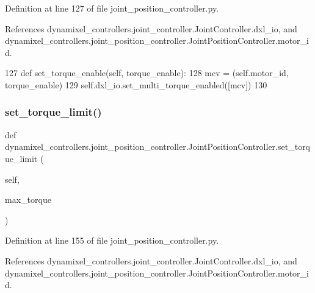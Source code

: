 Definition at line 127 of file joint\+\_\+position\+\_\+controller.\+py.



References dynamixel\+\_\+controllers.\+joint\+\_\+controller.\+Joint\+Controller.\+dxl\+\_\+io, and dynamixel\+\_\+controllers.\+joint\+\_\+position\+\_\+controller.\+Joint\+Position\+Controller.\+motor\+\_\+id.


\begin{DoxyCode}
127     \textcolor{keyword}{def }set\_torque\_enable(self, torque\_enable):
128         mcv = (self.motor\_id, torque\_enable)
129         self.dxl\_io.set\_multi\_torque\_enabled([mcv])
130 
\end{DoxyCode}
\mbox{\label{classdynamixel__controllers_1_1joint__position__controller_1_1_joint_position_controller_a6dcbc91c0934cf7a77e3b91156b7b62e}} 
\subsubsection{\texorpdfstring{set\+\_\+torque\+\_\+limit()}{set\_torque\_limit()}}
{\footnotesize\ttfamily def dynamixel\+\_\+controllers.\+joint\+\_\+position\+\_\+controller.\+Joint\+Position\+Controller.\+set\+\_\+torque\+\_\+limit (\begin{DoxyParamCaption}\item[{}]{self,  }\item[{}]{max\+\_\+torque }\end{DoxyParamCaption})}



Definition at line 155 of file joint\+\_\+position\+\_\+controller.\+py.



References dynamixel\+\_\+controllers.\+joint\+\_\+controller.\+Joint\+Controller.\+dxl\+\_\+io, and dynamixel\+\_\+controllers.\+joint\+\_\+position\+\_\+controller.\+Joint\+Position\+Controller.\+motor\+\_\+id.


